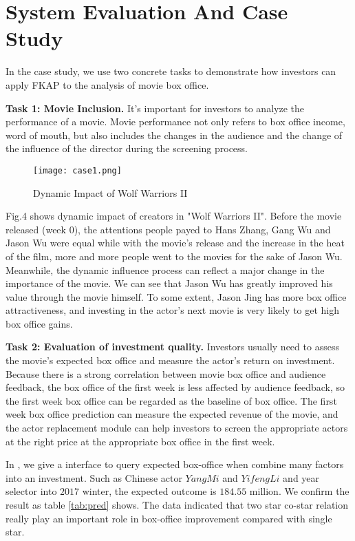 \section{System Evaluation And Case Study}
\label{sec:evo}
\par  In the case study, we use two concrete tasks to demonstrate how investors can apply FKAP to the analysis of movie box office.
\par \textbf{Task 1: Movie Inclusion.} It's important for investors to analyze the performance of a movie. Movie performance not only refers to box office income, word of mouth, but also includes the changes in the audience and the change of the influence of the director during the screening process.

\begin{figure}[!htbp]
\centering
\texttt{[image: case1.png]}
\caption{Dynamic Impact of Wolf Warriors II}
\label{fig:case1}
\end{figure}

\par Fig.4 shows dynamic impact of creators in "Wolf Warriors II". Before the movie released (week 0), the attentions people payed to Hans Zhang, Gang Wu and Jason Wu were equal while with the movie's release and the increase in the heat of the film, more and more people went to the movies for the sake of Jason Wu. Meanwhile, the dynamic influence process can reflect a major change in the importance of the movie. We can see that Jason Wu has greatly improved his value through the movie himself. To some extent, Jason Jing has more box office attractiveness, and investing in the actor's next movie is very likely to get high box office gains.

\par \textbf{Task 2: Evaluation of investment quality.} Investors usually need to assess the movie's expected box office and measure the actor's return on investment. Because there is a strong correlation between movie box office and audience feedback, the box office of the first week is less affected by audience feedback, so the first week box office can be regarded as the baseline of box office. The first week box office prediction can measure the expected revenue of the movie, and the actor replacement module can help investors to screen the appropriate actors at the right price at the appropriate box office in the first week.

\par In \system, we give a interface to query expected box-office when combine many factors into an investment. Such as Chinese actor $ YangMi$ and $YifengLi$ and year selector into $2017$ winter, the expected outcome is $184.55$ million. We confirm the result as table \ref{tab:pred} shows. The data indicated that two star co-star relation really play an important role in box-office improvement compared with single star.

